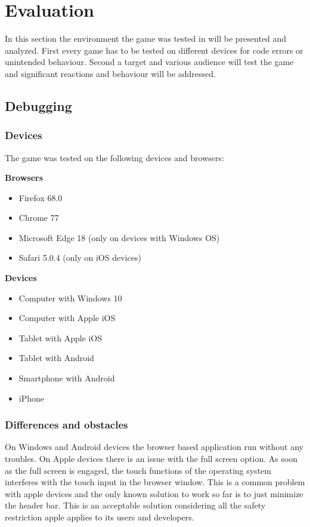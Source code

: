 
\chapter{Evaluation}\label{ch:evaluation}
In this section the environment the game was tested in will be presented and analyzed.
First every game has to be tested on different devices for code errors or unintended behaviour.
Second a target and various audience will test the game and significant reactions and behaviour will be addressed.

\section{Debugging}\label{sec:debugging}
\subsection{Devices}\label{subsec:devices}
The game was tested on the following devices and browsers:

\textbf{Browsers}
\begin{itemize}
    \item Firefox 68.0
    \item Chrome 77
    \item Microsoft Edge 18 (only on devices with Windows OS)
    \item Safari 5.0.4 (only on iOS devices)
\end{itemize}

\textbf{Devices}
\begin{itemize}
    \item Computer with Windows 10
    \item Computer with Apple iOS
    \item Tablet with Apple iOS
    \item Tablet with Android
    \item Smartphone with Android
    \item iPhone
\end{itemize}

\subsection{Differences and obstacles}\label{subsec:differences-and-obstacles}
On Windows and Android devices the browser based application run without any troubles.
On Apple devices there is an issue with the full screen option.
As soon as the full screen is engaged, the touch functions of the operating system interferes with the touch input in the
browser window. This is a common problem with apple devices and the only known solution to work so far is to just
minimize the header bar.
This is an acceptable solution considering all the safety restriction apple applies to its users and developers.

